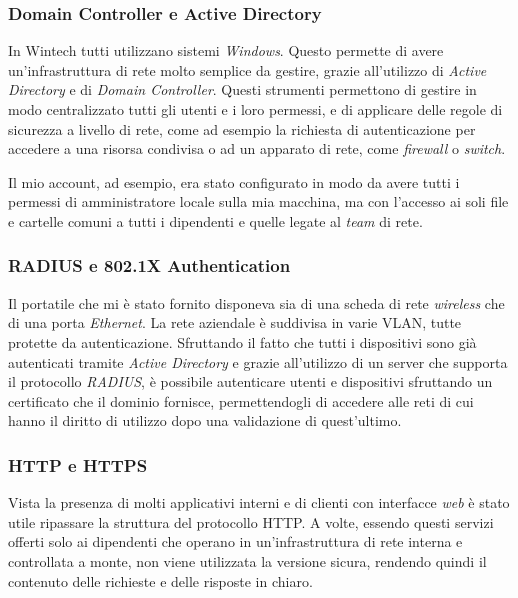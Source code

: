 \subsubsection{Domain Controller e Active Directory}

In Wintech tutti utilizzano sistemi \emph{Windows}. Questo permette di avere un'infrastruttura di rete molto semplice da gestire, grazie all'utilizzo di \emph{Active Directory} e di \emph{Domain Controller}. Questi strumenti permettono di gestire in modo centralizzato tutti gli utenti e i loro permessi, e di applicare delle regole di sicurezza a livello di rete, come ad esempio la richiesta di autenticazione per accedere a una risorsa condivisa o ad un apparato di rete, come \emph{firewall} o \emph{switch}.

Il mio account, ad esempio, era stato configurato in modo da avere tutti i permessi di amministratore locale sulla mia macchina, ma con l'accesso ai soli file e cartelle comuni a tutti i dipendenti e quelle legate al \emph{team} di rete.

\subsubsection{RADIUS e 802.1X Authentication}

Il portatile che mi è stato fornito disponeva sia di una scheda di rete \emph{wireless} che di una porta \emph{Ethernet}. La rete aziendale è suddivisa in varie VLAN, tutte protette da autenticazione. Sfruttando il fatto che tutti i dispositivi sono già autenticati tramite \emph{Active Directory} e grazie all'utilizzo di un server che supporta il protocollo \emph{RADIUS}, è possibile autenticare utenti e dispositivi sfruttando un certificato che il dominio fornisce, permettendogli di accedere alle reti di cui hanno il diritto di utilizzo dopo una validazione di quest'ultimo.

\subsubsection{HTTP e HTTPS}

Vista la presenza di molti applicativi interni e di clienti con interfacce \emph{web} è stato utile ripassare la struttura del protocollo HTTP. A volte, essendo questi servizi offerti solo ai dipendenti che operano in un'infrastruttura di rete interna e controllata a monte, non viene utilizzata la versione sicura, rendendo quindi il contenuto delle richieste e delle risposte in chiaro.

